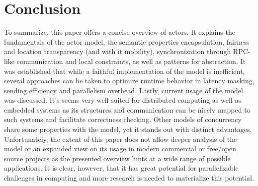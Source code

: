 \documentclass[A4]{article}
\begin{document}
\section{Conclusion}
\label{conclusion}
To summarize, this paper offers a concise overview of actors. It explains the fundamentals of the actor model, the semantic properties encapsulation, fairness and location transparency (and with it mobility), synchronization through RPC-like communication and local constraints, as well as patterns for abstraction. 
It was established that while a faithful implementation of the model is inefficient, several approaches can be taken to optimize runtime behavior in latency masking, sending efficiency and parallelism overhead.
Lastly, current usage of the model was discussed. It's seems very well suited for distributed computing as well as embedded systems as its structures and communication can be nicely mapped to such systems and facilitate correctness checking. 
Other models of concurrency share some properties with the model, yet it stands out with distinct advantages. \\
Unfortunately, the extent of this paper does not allow deeper analysis of the model or an expanded view on its usage in modern commercial or free/open source projects as the presented overview hints at a wide range of possible applications. It is clear, however, that it has great potential for parallelizable challenges in computing and more research is needed to materialize this potential.


\nocite{conf/eef/RenA96,WikiLang}%




\end{document}
